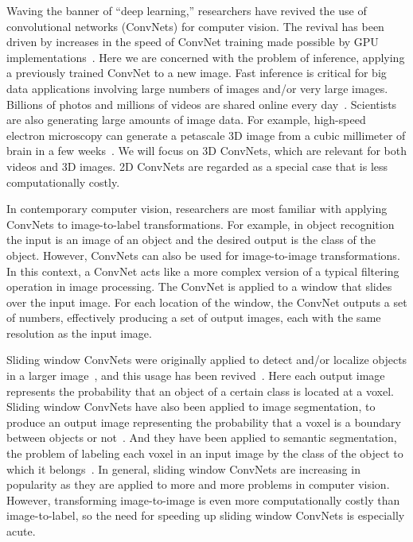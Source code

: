 \documentclass[conference]{./IEEEtran/IEEEtran}
\begin{document}
  Waving the banner of ``deep learning,'' researchers have revived the
  use of convolutional networks (ConvNets) for computer vision.  The
  revival has been driven by increases in the speed of ConvNet
  training made possible by GPU
  implementations~\cite{chellapilla2006high, scherer2010accelerating,
  strigl2010performance, ciresan2011flexible}. Here we are concerned
  with the problem of inference, applying a previously trained ConvNet
  to a new image.  Fast inference is critical for big data
  applications involving large numbers of images and/or very large
  images. Billions of photos and millions of videos are shared online
  every day~\cite{MeekerReport14, ReelSEO}.  Scientists are also
  generating large amounts of image data.  For example, high-speed
  electron microscopy can generate a petascale 3D image from a cubic
  millimeter of brain in a few weeks~\cite{Lichtman2014big}.  We will
  focus on 3D ConvNets, which are relevant for both videos and 3D
  images.  2D ConvNets are regarded as a special case that is less
  computationally costly.

  In contemporary computer vision, researchers are most familiar with
  applying ConvNets to image-to-label transformations.  For example,
  in object recognition the input is an image of an object and the
  desired output is the class of the object.  However, ConvNets can
  also be used for image-to-image transformations.  In this context, a
  ConvNet acts like a more complex version of a typical filtering
  operation in image processing.  The ConvNet is applied to a window
  that slides over the input image.  For each location of the window,
  the ConvNet outputs a set of numbers, effectively producing a set of
  output images, each with the same resolution as the input image.

  Sliding window ConvNets were originally applied to detect and/or
  localize objects in a larger image~\cite{matan1991multi}, and this
  usage has been revived~\cite{sermanet2013overfeat}. Here each output
  image represents the probability that an object of a certain class
  is located at a voxel.  Sliding window ConvNets have also been
  applied to image segmentation, to produce an output image
  representing the probability that a voxel is a boundary between
  objects or not~\cite{jain2007supervised}.  And they have been
  applied to semantic segmentation, the problem of labeling each voxel
  in an input image by the class of the object to which it
  belongs~\cite{ning2005toward}.  In general, sliding window ConvNets
  are increasing in popularity as they are applied to more and more
  problems in computer vision.  However, transforming image-to-image
  is even more computationally costly than image-to-label, so the need
  for speeding up sliding window ConvNets is especially acute.
\end{document}
